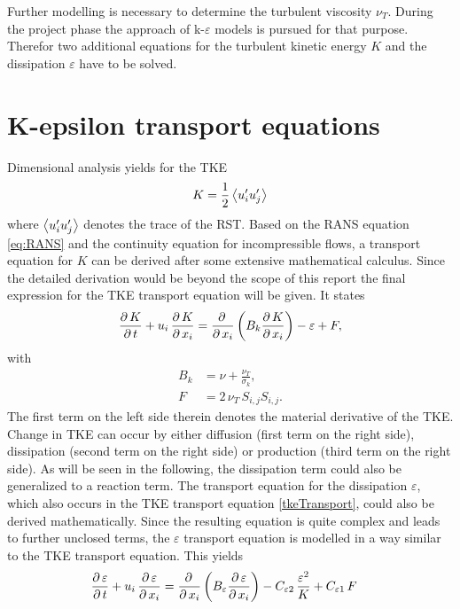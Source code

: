 Further modelling is necessary to determine the turbulent viscosity $\nu_T$. During the project phase the approach of k-$\varepsilon$ models is pursued for that purpose. Therefor two additional equations for the turbulent kinetic energy $K$ and the dissipation $\varepsilon$ have to be solved.

\section{K-epsilon transport equations} %
\label{sec:k_epsilon_transport_equations}

Dimensional analysis yields for the TKE
\begin{equation}
	K = \frac{1}{2} \left\langle u_i^{\prime}u_j^{\prime} \right\rangle
\end{equation}
where $\left\langle u_i^{\prime}u_j^{\prime} \right\rangle$ denotes the trace of the RST. Based on the RANS equation \eqref{eq:RANS} and the continuity equation for incompressible flows, a transport equation for $K$ can be derived after some extensive mathematical calculus. Since the detailed derivation would be beyond the scope of this report the final expression for the TKE transport equation will be given. It states
\begin{equation} \label{tkeTransport}
	\frac{\partial\,K}{\partial\,t} + u_i\,\frac{\partial\,K}{\partial\,x_i}
	=
	\frac{\partial\,}{\partial\,x_i}\left(  B_k \frac{\partial\,K}{\partial\,x_i} \right) 
	-
	\varepsilon
	+
	F,
\end{equation}
with
\begin{equation}
	\begin{split}
		B_k &= \nu + \frac{\nu_T}{\sigma_k}, \\
		F   &= 2\,\nu_T\,S_{i,j}S_{i,j}.
	\end{split}
\end{equation}
The first term on the left side therein denotes the material derivative of the TKE. Change in TKE can occur by either diffusion (first term on the right side), dissipation (second term on the right side) or production (third term on the right side). As will be seen in the following, the dissipation term could also be generalized to a reaction term.
The transport equation for the dissipation $\varepsilon$, which also occurs in the TKE transport equation \eqref{tkeTransport}, could also be derived mathematically. Since the resulting equation is quite complex and leads to further unclosed terms, the $\varepsilon$ transport equation is modelled in a way similar to the TKE transport equation. This yields
\begin{equation}
	\begin{split}
		\frac{\partial\,\varepsilon}{\partial\,t} + u_i\,\frac{\partial\,\varepsilon}{\partial\,x_i}
		&=
		\frac{\partial\,}{\partial\,x_i}\left( B_\varepsilon \frac{\partial\,\varepsilon}{\partial\,x_i} \right) 
		-
		C_{\varepsilon 2}\,\frac{\varepsilon^2}{K}
		+
		C_{\varepsilon 1}\,F
	\end{split}
\end{equation}
